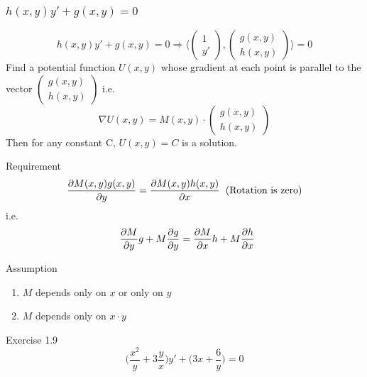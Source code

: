 \documentclass{beamer}
\begin{document}
\begin{frame}
\frametitle{$h(x,y)y'+g(x,y)=0$}
$$h(x,y)y'+g(x,y)=0\Rightarrow\langle\begin{pmatrix}
1\\
y'
\end{pmatrix},\begin{pmatrix}
g(x,y)\\
h(x,y)
\end{pmatrix}\rangle=0$$
Find a potential function $U(x,y)$ whose gradient at each point is parallel to the vector $\begin{pmatrix}
g(x,y)\\h(x,y)
\end{pmatrix}$ i.e.
$$\nabla U(x,y)=M(x,y)\cdot \begin{pmatrix}
g(x,y)\\h(x,y)
\end{pmatrix}$$
Then for any constant C, $U(x,y)=C$ is a solution.


\end{frame}


\begin{frame}
\begin{block}{Requirement}
$$\dfrac{\partial M(x,y)g(x,y)}{\partial y}=\dfrac{\partial M(x,y)h(x,y)}{\partial x}\hspace{2mm}\text{(Rotation is zero)}$$
i.e.
$$\hspace{2mm}\dfrac{\partial M}{\partial y}g+M\dfrac{\partial g}{\partial y}=\dfrac{\partial M}{\partial x}h+M\dfrac{\partial h}{\partial x}$$

\end{block}

\begin{block}{Assumption}
\begin{enumerate}
\item $M$ depends only on $x$ or only on $y$
\item $M$ depends only on $x\cdot y$
\end{enumerate}
\end{block}
\begin{block}{Exercise 1.9}
$$\Big(\dfrac{x^2}{y}+3\dfrac{y}{x}\Big)y'+\Big(3x+\dfrac{6}{y}\Big)=0$$
\end{block}


\end{frame}
\end{document}
